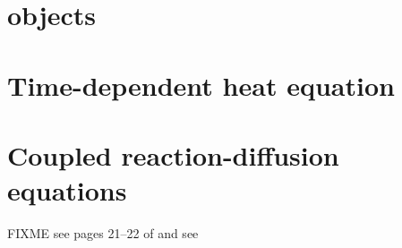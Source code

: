 
\section{\PETSc \pTS objects}

\section{Time-dependent heat equation}

\section{Coupled reaction-diffusion equations}

FIXME see pages 21--22 of \citep{HundsdorferVerwer2003} and see \citep{Pearson1993}
